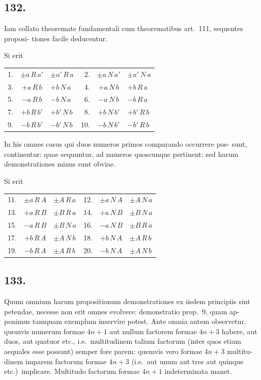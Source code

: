 \documentclass[12pt,a4paper]{article}
\theoremstyle{plain}
\theoremstyle{definition}
\theoremstyle{remark}
\begin{document}
\subsection*{132.}

Iam collato theoremate fundamentali cum theorematibus art.~111, sequentes proposi-
tiones facile deducentur.

Si erit
\begin{center}
\begin{tabular}{rcl@{\quad}rcl}
1. & $\pm a \, R \, a'$ & $\pm a' \, R \, a$ & 2. & $\pm a \, N \, a'$ & $\pm a' \, N \, a$ \\
3. & $+a \, R \, b$ & $+b \, N \, a$ & 4. & $+a \, N \, b$ & $+b \, R \, a$ \\
5. & $-a \, R \, b$ & $-b \, N \, a$ & 6. & $-a \, N \, b$ & $-b \, R \, a$ \\
7. & $+b \, R \, b'$ & $+b' \, N \, b$ & 8. & $+b \, N \, b'$ & $+b' \, R \, b$ \\
9. & $-b \, R \, b'$ & $-b' \, N \, b$ & 10. & $-b \, N \, b'$ & $-b' \, R \, b$
\end{tabular}
\end{center}

In his omnes casus qui duos numeros primos comparando occurrere pos-
sunt, continentur: quae sequuntur, ad numeros quoscunque pertinent: sed harum
demonstrationes minus sunt obviae.

Si erit
\begin{center}
\begin{tabular}{rcl@{\quad}rcl}
11. & $\pm a \, R \, A$ & $\pm A \, R \, a$ & 12. & $\pm a \, N \, A$ & $\pm A \, N \, a$ \\
13. & $+a \, R \, B$ & $\pm B \, R \, a$ & 14. & $+a \, N \, B$ & $\pm B \, N \, a$ \\
15. & $-a \, R \, B$ & $\pm B \, N \, a$ & 16. & $-a \, N \, B$ & $\pm B \, R \, a$ \\
17. & $+b \, R \, A$ & $\pm A \, N \, b$ & 18. & $+b \, N \, A$ & $\pm A \, R \, b$ \\
19. & $-b \, R \, A$ & $\pm A \, R \, b$ & 20. & $-b \, N \, A$ & $\pm A \, N \, b$
\end{tabular}
\end{center}


\subsection*{133.}

Quum omnium harum propositionum demonstrationes ex iisdem principiis
sint petendae, necesse non erit omnes evolvere: demonstratio prop.~9, quam ap-
ponimus tamquam exemplum inservire potest. Ante omnia autem observetur,
quemvis numerum formae $4n+1$ aut nullum factorem formae $4n+3$ habere,
aut duos, aut quatuor etc., i.e.\ multitudinem talium factorum (inter quos etiam
aequales esse possunt) semper fore parem: quemvis vero formae $4n+3$ multitu-
dinem imparem factorum formae $4n+3$ (i.e.\ aut unum aut tres aut quinque
etc.)\ implicare. Multitudo factorum formae $4n+1$ indeterminata manet.
\end{document}
